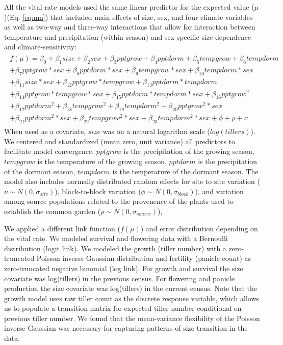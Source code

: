 \documentclass[11pt]{article}\usepackage[]{graphicx}\usepackage[usenames,dvipsnames]{xcolor}
\begin{document}
All the vital rate models used the same linear predictor for the expected value ($\mu$)(Eq. \ref{eq:mu}) that included main effects of size, sex, and four climate variables as well as two-way and three-way interactions that allow for interaction between temperature and precipitation (within season) and sex-specific size-dependence and climate-sensitivity:
\begin{align}\label{eq:mu}
\begin{split}
f(\mu) = \beta_{0} + \beta_{1}size + \beta_{2}sex + \beta_{3}pptgrow + \beta_{4}pptdorm + \beta_{5}tempgrow + \beta_{6}tempdorm \\ 
+ \beta_{7}pptgrow*sex + \beta_{8}pptdorm*sex + \beta_{9}tempgrow*sex + \beta_{10}tempdorm*sex  \\ 
+  \beta_{11}size*sex + \beta_{12}pptgrow*tempgrow + \beta_{13}pptdorm*tempdorm\\
+ \beta_{14}pptgrow*tempgrow*sex + \beta_{15}pptdorm*tempdorm*sex + \beta_{16}pptgrow^2\\
+ \beta_{17}pptdorm^2 + \beta_{18}tempgrow^2 + \beta_{19}tempdorm^2 + \beta_{20}pptgrow^2*sex  \\
+ \beta_{21}pptdorm^2*sex + \beta_{22}tempgrow^2*sex + \beta_{23}tempdorm^2*sex + \phi + \rho + \nu 
\end{split}
\end{align}
\noindent When used as a covariate, $size$ was on a natural logarithm scale ($log(tillers)$). 
We centered and standardized (mean zero, unit variance) all predictors to facilitate model convergence.
$pptgrow$ is the precipitation of the growing season, $tempgrow$ is the temperature of the growing season, $pptdorm$ is the precipitation of the dormant season, $tempdorm$ is the temperature of the dormant season.
The model also includes normally distributed random effects for site to site variation ($\nu \sim N(0,\sigma_{site})$), block-to-block variation ($\phi \sim N(0,\sigma_{block})$), and variation among source populations related to the provenence of the plants used to establish the common garden ($\rho \sim N(0,\sigma_{source})$), 

We applied a different link function ($f(\mu)$) and error distribution depending on the vital rate. 
We modeled survival and flowering data with a Bernoulli distribution (logit link).
We modeled the growth (tiller number) with a zero-truncated Poisson inverse Gaussian distribution and fertility (panicle count) as zero-truncated negative binomial (log link). 
For growth and survival the size covariate was log(tillers) in the previous census. 
For flowering and panicle production the size covariate was log(tillers) in the current census. 
Note that the growth model uses raw tiller count as the discrete response variable, which allows us to populate a transition matrix for expected tiller number conditional on previous tiller number. 
We found that the mean-variance flexibility of the Poisson inverse Gaussian was necessary for capturing patterns of size transition in the data. 
\end{document}

